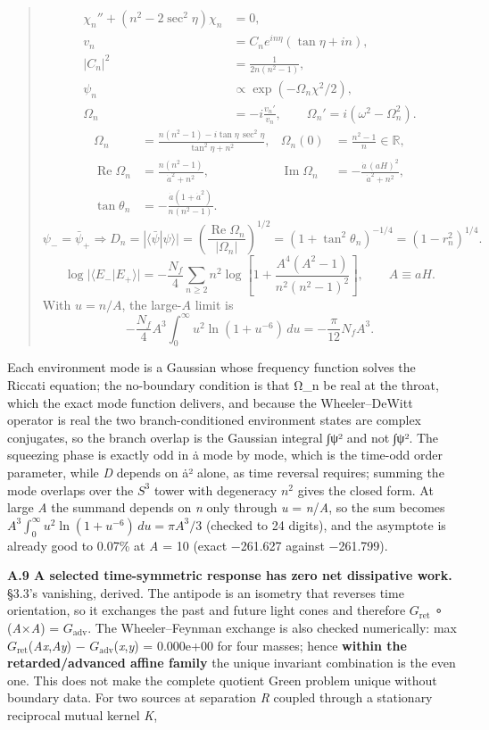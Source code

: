\documentclass[
]{article}
\begin{document}
\begin{quote}
\[
\begin{aligned}
\chi_n''+(n^2-2\sec^2\eta)\chi_n&=0,\\
v_n&=C_n e^{in\eta}(\tan\eta+in),\\
|C_n|^2&=\frac{1}{2n(n^2-1)},\\
\psi_n&\propto\exp(-\Omega_n\chi^2/2),\\
\Omega_n&=-i\frac{v_n'}{v_n},\qquad
\Omega_n'=i(\omega^2-\Omega_n^2).
\end{aligned}
\] \[
\begin{aligned}
\Omega_n&=\frac{n(n^2-1)-i\tan\eta\,\sec^2\eta}{\tan^2\eta+n^2},
&\Omega_n(0)&=\frac{n^2-1}{n}\in\mathbb R,\\
\operatorname{Re}\Omega_n&=\frac{n(n^2-1)}{\dot a^2+n^2},
&\operatorname{Im}\Omega_n&=-\frac{\dot a\,(aH)^2}{\dot a^2+n^2},\\
\tan\theta_n&=-\frac{\dot a(1+\dot a^2)}{n(n^2-1)}.
\end{aligned}
\] \[
\psi_-=\bar\psi_+
\Longrightarrow
D_n=|\langle\bar\psi|\psi\rangle|
=\left(\frac{\operatorname{Re}\Omega_n}{|\Omega_n|}\right)^{1/2}
=(1+\tan^2\theta_n)^{-1/4}=(1-r_n^2)^{1/4}.
\] \[
\log|\langle E_-|E_+\rangle|
=-\frac{N_f}{4}\sum_{n\ge2}n^2
\log\!\left[1+\frac{A^4(A^2-1)}{n^2(n^2-1)^2}\right],
\qquad A\equiv aH.
\] With \(u=n/A\), the large-\(A\) limit is \[
-\frac{N_f}{4}A^3\int_0^\infty u^2\ln(1+u^{-6})\,du
=-\frac{\pi}{12}N_fA^3.
\]
\end{quote}

Each environment mode is a Gaussian whose frequency function solves the
Riccati equation; the no-boundary condition is that Ω\_n be real at the
throat, which the exact mode function delivers, and because the
Wheeler--DeWitt operator is real the two branch-conditioned environment
states are complex conjugates, so the branch overlap is the Gaussian
integral ∫ψ² and not ∫\textbar ψ\textbar². The squeezing phase is
exactly odd in ȧ mode by mode, which is the time-odd order parameter,
while \textbar{}\emph{D}\textbar{} depends on ȧ² alone, as time reversal
requires; summing the mode overlaps over the \(S^3\) tower with
degeneracy \(n^2\) gives the closed form. At large \emph{A} the summand
depends on \emph{n} only through \emph{u} = \emph{n}/\emph{A}, so the
sum becomes \(A^3\int_0^\infty u^2\ln(1+u^{-6})\,du=\pi A^3/3\) (checked
to 24 digits), and the asymptote is already good to 0.07\% at \emph{A} =
10 (exact −261.627 against −261.799).

\textbf{A.9 A selected time-symmetric response has zero net dissipative
work.} §3.3's vanishing, derived. The antipode is an isometry that
reverses time orientation, so it exchanges the past and future light
cones and therefore \(G_{\mathrm{ret}}\) ∘ (\emph{A}×\emph{A}) =
\(G_{\mathrm{adv}}\). The Wheeler--Feynman exchange is also checked
numerically: max \textbar{}\(G_{\mathrm{ret}}\)(\emph{Ax},\emph{Ay}) −
\(G_{\mathrm{adv}}\)(\emph{x},\emph{y})\textbar{} = 0.000e+00 for four
masses; hence \textbf{within the retarded/advanced affine family} the
unique invariant combination is the even one. This does not make the
complete quotient Green problem unique without boundary data. For two
sources at separation \emph{R} coupled through a stationary reciprocal
mutual kernel \emph{K},
\end{document}

